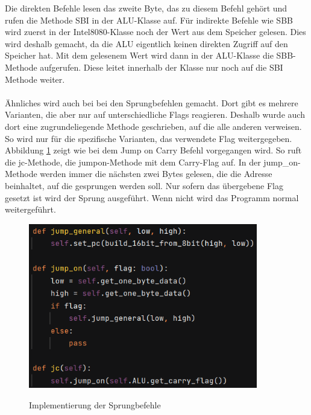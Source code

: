 \documentclass[12pt]{article}
\newcommand{\imgSpaceBefore}{\\[0.2cm]}
\begin{document}
\noindent
Die direkten Befehle lesen das zweite Byte, das zu diesem Befehl gehört und rufen die
Methode SBI in der ALU-Klasse auf. Für indirekte Befehle wie SBB wird zuerst in der Intel8080-Klasse noch der Wert aus dem Speicher gelesen. Dies wird deshalb gemacht, da die ALU eigentlich keinen direkten Zugriff auf den Speicher hat. Mit dem gelesenem Wert wird dann in der ALU-Klasse die SBB-Methode aufgerufen. Diese leitet innerhalb der Klasse nur noch auf die SBI Methode weiter.
\\\\
Ähnliches wird auch bei bei den Sprungbefehlen gemacht. Dort gibt es mehrere Varianten, die aber nur auf unterschiedliche Flags reagieren. Deshalb wurde auch dort eine zugrundeliegende Methode geschrieben, auf die alle anderen verweisen. So wird nur für die spezifische Varianten, das verwendete Flag weitergegeben.  Abbildung \ref{fig:JumpVariants} zeigt wie bei dem Jump on Carry Befehl vorgegangen wird. So ruft die jc-Methode, die jump\-on-Methode mit dem Carry-Flag auf. In der jump\_on-Methode werden immer die nächsten zwei Bytes gelesen, die die Adresse beinhaltet, auf die gesprungen werden soll. Nur sofern das übergebene Flag gesetzt ist wird der Sprung ausgeführt. Wenn nicht wird das Programm normal weitergeführt.
\imgSpaceBefore
\begin{figure}[H]
\caption{Implementierung der Sprungbefehle}
\centering
\includegraphics[width=10cm]{Bilder/JumpVariants}
\label{fig:JumpVariants}
\end{figure}
\end{document}
